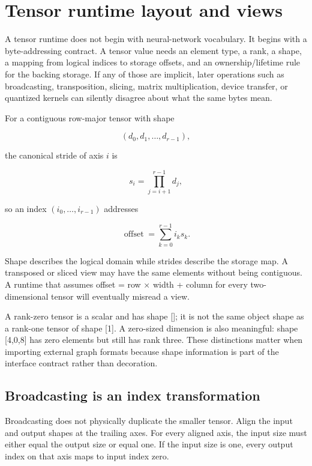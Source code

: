 \hypertarget{appendix-cebadf3106d1}{}
\section{Tensor runtime layout and views}\label{appendix-cebadf3106d1-tensor-runtime-layout-and-views}

A tensor runtime does not begin with neural-network vocabulary. It begins with a byte-addressing contract. A tensor value needs an element type, a rank, a shape, a mapping from logical indices to storage offsets, and an ownership/lifetime rule for the backing storage. If any of those are implicit, later operations such as broadcasting, transposition, slicing, matrix multiplication, device transfer, or quantized kernels can silently disagree about what the same bytes mean.

For a contiguous row-major tensor with shape

\[
(d_0,d_1,\ldots,d_{r-1}),
\]

the canonical stride of axis \(i\) is

\[
s_i = \prod_{j=i+1}^{r-1} d_j,
\]

so an index \((i_0,\ldots,i_{r-1})\) addresses

\[
\operatorname{offset}=\sum_{k=0}^{r-1} i_k s_k.
\]

Shape describes the logical domain while strides describe the storage map. A transposed or sliced view may have the same elements without being contiguous. A runtime that assumes offset = row × width + column for every two-dimensional tensor will eventually misread a view.

A rank-zero tensor is a scalar and has shape {[}{]}; it is not the same object shape as a rank-one tensor of shape {[}1{]}. A zero-sized dimension is also meaningful: shape {[}4,0,8{]} has zero elements but still has rank three. These distinctions matter when importing external graph formats because shape information is part of the interface contract rather than decoration.

\subsection{Broadcasting is an index transformation}\label{appendix-cebadf3106d1-broadcasting-is-an-index-transformation}

Broadcasting does not physically duplicate the smaller tensor. Align the input and output shapes at the trailing axes. For every aligned axis, the input size must either equal the output size or equal one. If the input size is one, every output index on that axis maps to input index zero.

